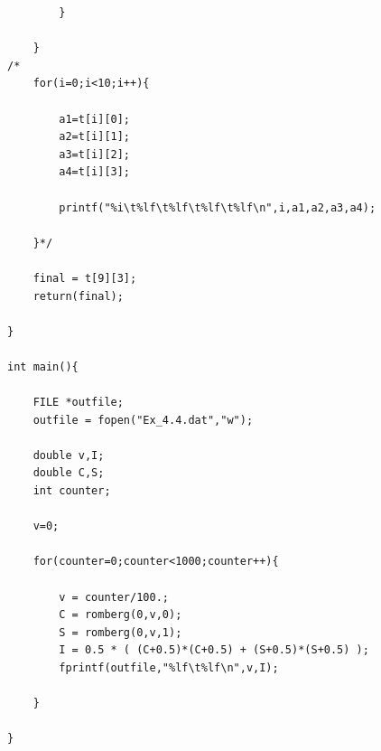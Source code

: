 \documentclass[12pt]{article}
\begin{document}
\begin{verbatim}
		}

	}
/*
	for(i=0;i<10;i++){

		a1=t[i][0];
		a2=t[i][1];
		a3=t[i][2];
		a4=t[i][3];

		printf("%i\t%lf\t%lf\t%lf\t%lf\n",i,a1,a2,a3,a4);

	}*/
	
	final = t[9][3];
	return(final);

}

int main(){

	FILE *outfile;
	outfile = fopen("Ex_4.4.dat","w");

	double v,I;
	double C,S;
	int counter;

	v=0;

	for(counter=0;counter<1000;counter++){

		v = counter/100.;
		C = romberg(0,v,0);
		S = romberg(0,v,1);
		I = 0.5 * ( (C+0.5)*(C+0.5) + (S+0.5)*(S+0.5) );
		fprintf(outfile,"%lf\t%lf\n",v,I);

	}

}
\end{verbatim}
\end{document}
